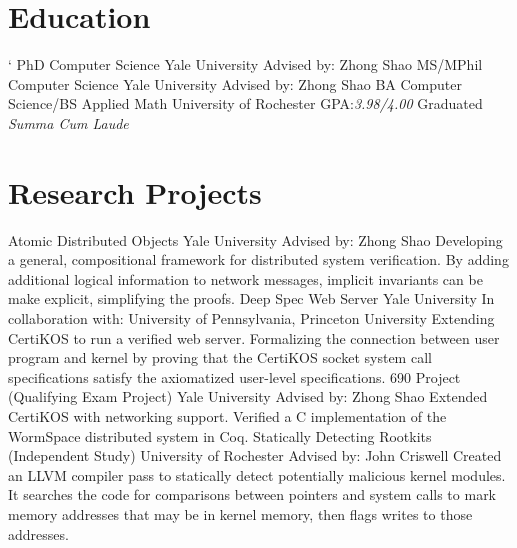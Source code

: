 \documentclass[10pt,letterpaper,sans]{moderncv}
\begin{document}
\renewcommand*{\namefont}{\fontsize{20}{24}\mdseries\upshape}
\makecvtitle{}
\vspace{-1cm}

\section{Education}
`
        {PhD Computer Science}
        {Yale University}
        {}
        {}
        {Advised by: Zhong Shao}
        {MS/MPhil Computer Science}
        {Yale University}
        {}
        {}
        {Advised by: Zhong Shao}
        {BA Computer Science/BS Applied Math}
        {University of Rochester}
        {}
        {GPA:\@ \textit{3.98/4.00}}
        {Graduated \textit{Summa Cum Laude}}

\section{Research Projects}

        {Atomic Distributed Objects}
        {Yale University}
        {Advised by: Zhong Shao}
        {}
        {Developing a general, compositional framework for distributed system
        verification.
        By adding additional logical information to network messages, implicit
        invariants can be make explicit, simplifying the proofs.}
        {Deep Spec Web Server}
        {Yale University}
        {In collaboration with: University of Pennsylvania, Princeton University}
        {}
        {Extending CertiKOS to run a verified web server.
         Formalizing the connection between user program and kernel by proving
         that the CertiKOS socket system call specifications satisfy the
         axiomatized user-level specifications.}
        {690 Project (Qualifying Exam Project)}
        {Yale University}
        {Advised by: Zhong Shao}
        {}
        {Extended CertiKOS with networking support.
         Verified a C implementation of the WormSpace distributed system in Coq.}
        {Statically Detecting Rootkits (Independent Study)}
        {University of Rochester}
        {Advised by: John Criswell}
        {}
        {Created an LLVM compiler pass to statically detect potentially
         malicious kernel modules.
         It searches the code for comparisons between pointers and system calls
         to mark memory addresses that may be in kernel memory, then flags
         writes to those addresses.}
\end{document}
